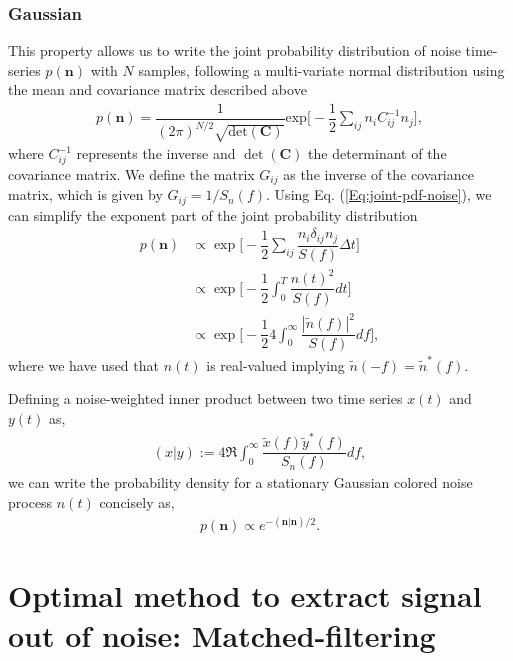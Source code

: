 \subsubsection{Gaussian}

This property allows us to write the joint probability distribution of noise time-series $p(\textbf{n})$ with $N$ samples, following a multi-variate normal distribution using the mean and covariance matrix described above 
\begin{align}
    p(\textbf{n}) = \dfrac{1}{(2\pi)^{N/2}\sqrt{\text{det}(\textbf{C})}}\text{exp}\Bigg[-\dfrac{1}{2} \sum_{ij}n_{i}C_{ij}^{-1}n_j  \Bigg],
    \label{Eq:joint-pdf-noise}
\end{align}
where $C_{ij}^{-1}$ represents the inverse and $\det(\textbf{C})$ the determinant of the covariance matrix. We define the matrix $G_{ij}$ as the inverse of the covariance matrix, which is given by $G_{ij} = 1/S_n(f)$. Using Eq. (\ref{Eq:joint-pdf-noise}), we can simplify the exponent part of the joint probability distribution 
\begin{align}
    p(\textbf{n}) & \propto \exp \Bigg[ - \dfrac{1}{2} \sum_{ij} \dfrac{n_i \delta_{ij} n_j}{S(f)} \Delta t \Bigg]\\
    &  \propto  \exp \Bigg[ - \dfrac{1}{2} \int_{0}^{T} \dfrac{n(t)^2}{S(f)} dt \Bigg] \\
    &  \propto  \exp \Bigg[ - \dfrac{1}{2} 4\int_{0}^{\infty} \dfrac{|\tilde{n}(f)|^2}{S(f)} df \Bigg],
\end{align}
where we have used that $n(t)$ is real-valued implying $\tilde{n}(-f) = \tilde{n}^*(f)$.

Defining a noise-weighted inner product between two time series $x(t)$ and $y(t)$ as,
\begin{align}
    (x|y) := 4 \Re \int_{0}^{\infty} \dfrac{\tilde{x}(f)\tilde{y}^*(f)}{S_n(f)} df,
    \label{Eq:inner-product}
\end{align}
we can write the probability density for a stationary Gaussian colored noise process $n(t)$ concisely as,
\begin{align}
    p(\textbf{n}) \propto e^{-(\textbf{n}|\textbf{n})/2}.
    \label{Eq:noise-probability}
\end{align}

\section{Optimal method to extract signal out of noise: Matched-filtering}

